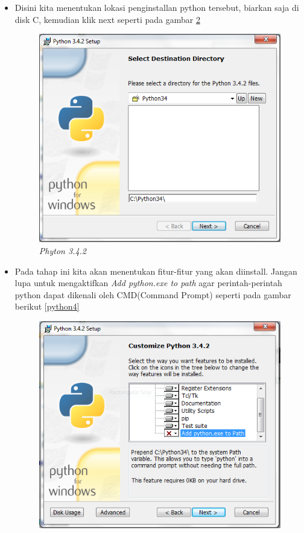 \begin{enumerate}
\begin{itemize}
\begin{figure}[!htbp]
    \caption{\textit{Phyton 3.4.2}}
    \label{python2}
    \end{figure}
    \item Disini kita menentukan lokasi penginstallan python tersebut, biarkan saja di disk C, kemudian klik next seperti pada gambar \ref{python3}
    \begin{figure}[!htbp]
    \centering 
    \includegraphics[scale=0.5]{figures/python3.PNG} 
    \caption{\textit{Phyton 3.4.2}}
    \label{python3}
    \end{figure}
    \item Pada tahap ini kita akan menentukan fitur-fitur yang akan diinstall. Jangan lupa untuk mengaktifkan \textit{Add python.exe to path} agar perintah-perintah python dapat dikenali oleh CMD(Command Prompt) seperti pada gambar berikut \ref{python4}
    \begin{figure}[!htbp]
    \centering 
    \includegraphics[scale=0.5]{figures/python4.PNG} 

\end{figure}
\end{itemize}
\end{enumerate}

